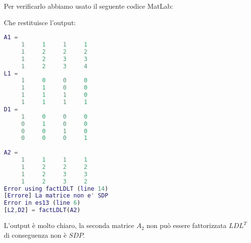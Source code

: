 \begin{flushleft}
Per verificarlo abbiamo usato il seguente codice MatLab:

Che restituisce l'output:
\begin{lstlisting}[language=matlab, basicstyle = \small]
A1 =
     1     1     1     1
     1     2     2     2
     1     2     3     3
     1     2     3     4
L1 =
     1     0     0     0
     1     1     0     0
     1     1     1     0
     1     1     1     1
D1 =
     1     0     0     0
     0     1     0     0
     0     0     1     0
     0     0     0     1
     
A2 =
     1     1     1     1
     1     2     2     2
     1     2     3     3
     1     2     3     2
Error using factLDLT (line 14)
[Errore] La matrice non e' SDP
Error in es13 (line 6)
[L2,D2] = factLDLT(A2) 
\end{lstlisting}
L'output è molto chiaro, la seconda matrice $A_{2}$ non può essere fattorizzata $LDL^T$ di conseguenza non è $SDP$.
\end{flushleft}

